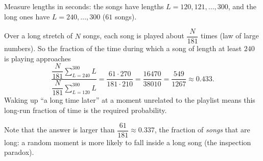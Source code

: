 Measure lengths in seconds: the songs have lengths $L=120,121,\dots,300$, and the long ones have $L=240,\dots,300$ ($61$ songs).

Over a long stretch of $N$ songs, each song is played about $\dfrac{N}{181}$ times (law of large numbers). So the fraction of the time during which a song of length at least $240$ is playing approaches
\[\dfrac{\dfrac{N}{181}\displaystyle\sum_{L=240}^{300}L}{\dfrac{N}{181}\displaystyle\sum_{L=120}^{300}L}=\dfrac{61\cdot270}{181\cdot210}=\dfrac{16470}{38010}=\boxed{\dfrac{549}{1267}}\approx0.433.\]
Waking up ``a long time later'' at a moment unrelated to the playlist means this long-run fraction of time is the required probability.

Note that the answer is larger than $\dfrac{61}{181}\approx0.337$, the fraction of \emph{songs} that are long: a random moment is more likely to fall inside a long song (the inspection paradox).
